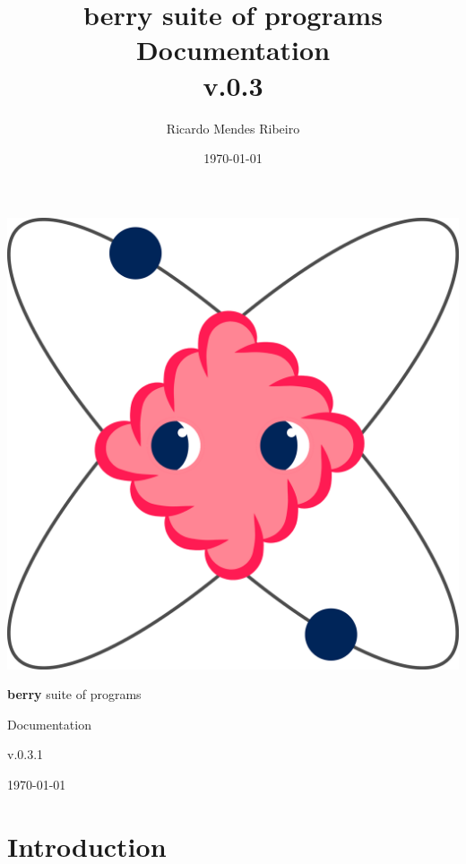 \documentclass[a4paper,12pt]{report}
\title{{\bf berry} suite of programs\\
\large Documentation \\
v.0.3}
\author{Ricardo Mendes Ribeiro}
\date{\today}
\begin{document}
\begin{titlepage}
 \begin{center}
 \includegraphics[scale=0.3,keepaspectratio=true]{figures/BerryLogo.png}
\vspace*{2cm}

  \begin{Huge}{\bf berry} suite of programs  \end{Huge}
  \vspace*{1cm}

 \begin{LARGE}Documentation              \end{LARGE}
  \vspace*{1cm}

\begin{Huge}v.0.3.1\end{Huge}
  \vspace*{0.5cm}

\today

 \end{center}
\end{titlepage}

\tableofcontents

\chapter{Introduction}\label{ch:introduction}
\end{document}
